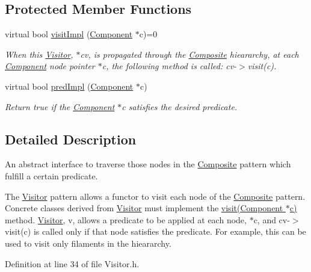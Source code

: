 \subsection*{Protected Member Functions}
\begin{DoxyCompactItemize}
\item 
virtual bool \hyperlink{classVisitor_a1ebdba266c77626f67a22fc2300d8dc3}{visit\+Impl} (\hyperlink{classComponent}{Component} $\ast$c)=0
\begin{DoxyCompactList}\small\item\em When this \hyperlink{classVisitor}{Visitor}, $\ast$cv, is propagated through the \hyperlink{classComposite}{Composite} hieararchy, at each \hyperlink{classComponent}{Component} node pointer $\ast$c, the following method is called\+: cv-\/$>$visit(c). \end{DoxyCompactList}\item 
virtual bool \hyperlink{classVisitor_a5f9d231f1ac00bd232085ee6e6547de0}{pred\+Impl} (\hyperlink{classComponent}{Component} $\ast$c)
\begin{DoxyCompactList}\small\item\em Return true if the \hyperlink{classComponent}{Component} $\ast$c satisfies the desired predicate. \end{DoxyCompactList}\end{DoxyCompactItemize}


\subsection{Detailed Description}
An abstract interface to traverse those nodes in the \hyperlink{classComposite}{Composite} pattern which fulfill a certain predicate. 

The \hyperlink{classVisitor}{Visitor} pattern allows a functor to visit each node of the \hyperlink{classComposite}{Composite} pattern. Concrete classes derived from \hyperlink{classVisitor}{Visitor} must implement the \hyperlink{classVisitor_a3f8ea7ad6aa61e99d8d1bc0576bdf23c}{visit(\+Component $\ast$c)} method. \hyperlink{classVisitor}{Visitor}, v, allows a predicate to be applied at each node, $\ast$c, and cv-\/$>$visit(c) is called only if that node satisfies the predicate. For example, this can be used to visit only filaments in the hieararchy. 

Definition at line 34 of file Visitor.\+h.



